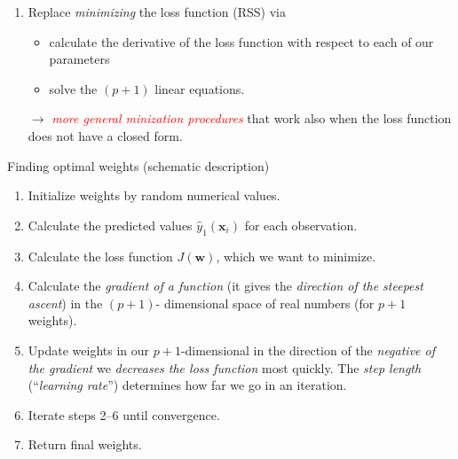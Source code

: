 \documentclass[10pt,ignorenonframetext,]{beamer}
\providecommand{\tightlist}{%
  \setlength{\itemsep}{0pt}\setlength{\parskip}{0pt}}
\begin{document}
\begin{frame}

\begin{enumerate}
\def\labelenumi{\arabic{enumi}.}
\setcounter{enumi}{2}
\tightlist
\item
  Replace \emph{minimizing} the loss function (RSS) via

  \begin{itemize}
  \tightlist
  \item
    calculate the derivative of the loss function with respect to each
    of our parameters
  \item
    solve the \((p+1)\) linear equations.
  \end{itemize}

  \(\rightarrow\)
  \emph{\textcolor{red}{more general minization procedures}} that work
  also when the loss function does not have a closed form.
\end{enumerate}

\end{frame}

\begin{frame}

\begin{block}{Finding optimal weights (schematic description)}

\begin{enumerate}
\def\labelenumi{\arabic{enumi}.}
\item
  Initialize weights by random numerical values.
\item
  Calculate the predicted values \(\hat{y}_1({\boldsymbol x}_i)\) for
  each observation.
\item
  Calculate the loss function \(J(\boldsymbol{w})\), which we want to
  minimize.
\item
  Calculate the \emph{gradient of a function} (it gives the
  \emph{direction of the steepest ascent}) in the \((p+1)\)- dimensional
  space of real numbers (for \(p+1\) weights).
\item
  Update weights in our \(p+1\)-dimensional in the direction of the
  \emph{negative of the gradient} we \emph{decreases the loss function}
  most quickly. The \emph{step length} (``\emph{learning rate}'')
  determines how far we go in an iteration.
\item
  Iterate steps 2--6 until convergence.
\item
  Return final weights.
\end{enumerate}

\end{block}

\end{frame}
\end{document}
